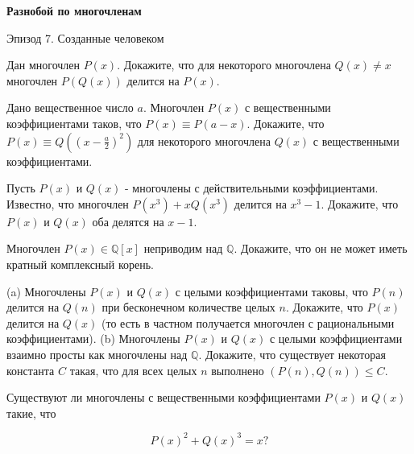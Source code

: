 \centerline{\bf \Huge Разнобой по многочленам}

\begin{flushright}
        \scriptsize{Эпизод 7. Созданные человеком}
\end{flushright}

Дан многочлен $P(x)$. Докажите, что для некоторого многочлена $Q(x) \neq x$ многочлен $P(Q(x))$ делится на $P(x)$.

Дано вещественное число $a$. Многочлен $P(x)$ с вещественными коэффициентами таков, что $P(x) \equiv P(a-x)$. Докажите, что $P(x) \equiv Q\left(\left(x-\frac{a}{2}\right)^2\right)$ для некоторого многочлена $Q(x)$ с вещественными коэффициентами.

Пусть $P(x)$ и $Q(x)$ - многочлены с действительными коэффициентами. Известно, что многочлен $P\left(x^3\right)+x Q\left(x^3\right)$ делится на $x^3-1$. Докажите, что $P(x)$ и $Q(x)$ оба делятся на $x-1$.

Многочлен $P(x) \in \mathbb{Q}[x]$ неприводим над $\mathbb{Q}$. Докажите, что он не может иметь кратный комплексный корень.

(a) Многочлены $P(x)$ и $Q(x)$ с целыми коэффициентами таковы, что $P(n)$ делится на $Q(n)$ при бесконечном количестве целых $n$. Докажите, что $P(x)$ делится на $Q(x)$ (то есть в частном получается многочлен с рациональными коэффициентами).
(b) Многочлены $P(x)$ и $Q(x)$ с целыми коэффициентами взаимно просты как многочлены над $\mathbb{Q}$. Докажите, что существует некоторая константа $C$ такая, что для всех целых $n$ выполнено $(P(n), Q(n)) \leqslant C$.

Существуют ли многочлены с вещественными коэффициентами $P(x)$ и $Q(x)$ такие, что

$$
P(x)^2+Q(x)^3=x ?
$$